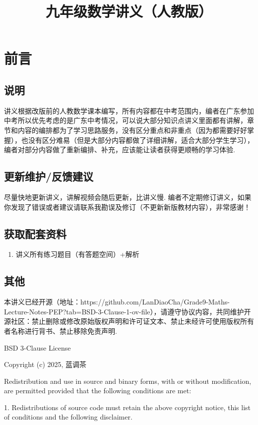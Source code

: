 \documentclass[lang=cn, 10pt, titlestyle=display, oneside, toc=twocol]{elegantbook}
\title{九年级数学讲义（人教版）}
\begin{document}
\chapter*{前言}

\section*{说明}

讲义根据改版前的人教数学课本编写，所有内容都在中考范围内，编者在广东参加中考所以优先考虑的是广东中考情况，可以说大部分知识点讲义里面都有讲解，章节和内容的编排都为了学习思路服务，没有区分重点和非重点（因为都需要好好掌握），也没有区分难易（但是大部分内容都做了详细讲解，适合大部分学生学习），编者对部分内容做了重新编排、补充，应该能让读者获得更顺畅的学习体验.

\section*{更新维护/反馈建议}

尽量快地更新讲义，讲解视频会随后更新，比讲义慢. 编者不定期修订讲义，如果你发现了错误或者建议请联系我勘误及修订（不更新新版教材内容），非常感谢！


\section*{获取配套资料}

\begin{enumerate}
    \item 讲义所有练习题目（有答题空间）+解析
\end{enumerate}


\section*{其他}

本讲义已经开源（地址：https://github.com/LanDiaoCha/Grade9-Maths-Lecture-Notes-PEP?tab=BSD-3-Clause-1-ov-file），请遵守协议内容，共同维护开源社区：禁止删除或修改原始版权声明和许可证文本、禁止未经许可使用版权所有者名称进行背书、禁止移除免责声明.
\par
BSD 3-Clause License

Copyright (c) 2025, 蓝调茶

Redistribution and use in source and binary forms, with or without
modification, are permitted provided that the following conditions are met:

1. Redistributions of source code must retain the above copyright notice, this
   list of conditions and the following disclaimer.
\end{document}
